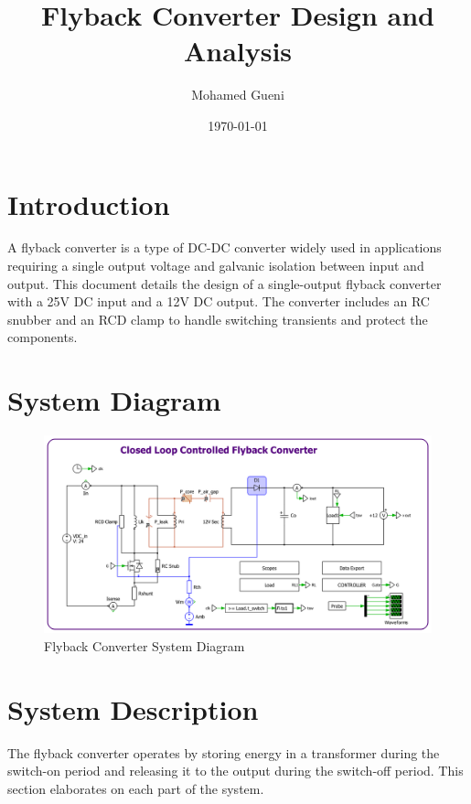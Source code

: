 \documentclass{article}
\begin{document}
\title{Flyback Converter Design and Analysis}
\author{Mohamed Gueni}
\date{\today}
\maketitle
\tableofcontents

\section{Introduction}
A flyback converter is a type of DC-DC converter widely used in applications requiring a single output voltage and galvanic isolation between input and output. This document details the design of a single-output flyback converter with a 25V DC input and a 12V DC output. The converter includes an RC snubber and an RCD clamp to handle switching transients and protect the components.

\section{System Diagram}
\begin{figure}[htbp]
    \centering
    \includegraphics[width=\textwidth]{flyback.jpg}
    \caption{Flyback Converter System Diagram}
    \label{fig:Flyback}
\end{figure}

\section{System Description}
The flyback converter operates by storing energy in a transformer during the switch-on period and releasing it to the output during the switch-off period. This section elaborates on each part of the system.
\end{document}

